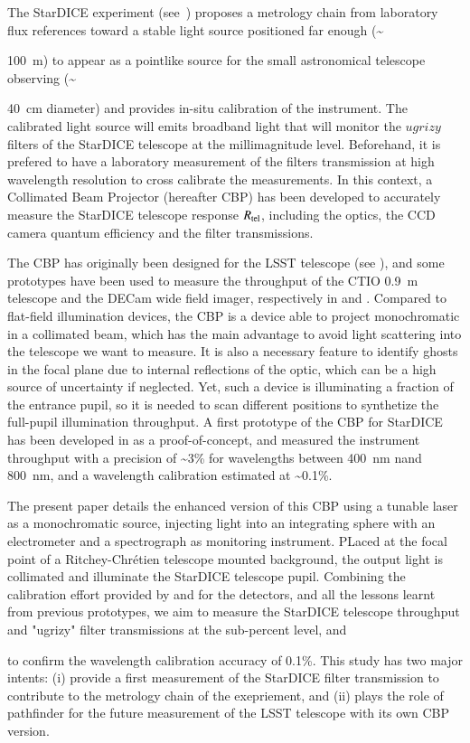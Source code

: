 The StarDICE experiment (see~\cite{Betoule_2023}) proposes a metrology chain from laboratory flux references toward a stable light source positioned far enough (\textasciitilde {\SI{100}{\meter}) to appear as a pointlike source for the small astronomical telescope observing (\textasciitilde {\SI{40}{\centi\meter} diameter) and provides in-situ calibration of the instrument. The calibrated light source will emits broadband light that will monitor the $ugrizy$ filters of the StarDICE telescope at the millimagnitude level. Beforehand, it is prefered to have a laboratory measurement of the filters transmission at high wavelength resolution to cross calibrate the measurements. In this context, a Collimated Beam Projector (hereafter CBP) has been developed to accurately measure the StarDICE telescope response $R_{\mathrm{tel}}$, including the optics, the CCD camera quantum efficiency and the filter transmissions. 

The CBP has originally been designed for the LSST telescope (see \cite{ingraham2016}), and some prototypes have been used to measure the throughput of the CTIO \SI{0.9}{\meter} telescope and the DECam wide field imager, respectively in \cite{coughlin2018} and \cite{coughlin2016}. Compared to flat-field illumination devices, the CBP is a device able to project monochromatic in a collimated beam, which has the main advantage to avoid light scattering into the telescope we want to measure. It is also a necessary feature to identify ghosts in the focal plane due to internal reflections of the optic, which can be a high source of uncertainty if neglected. Yet, such a device is illuminating a fraction of the entrance pupil, so it is needed to scan different positions to synthetize the full-pupil illumination throughput. A first prototype of the CBP for StarDICE has been developed in \cite{Mondrik_2023} as a proof-of-concept, and measured the instrument throughput with a precision of \textasciitilde 3\% for wavelengths between \SI{400}{\nano\meter} nand \SI{800}{\nano\meter}, and a wavelength calibration estimated at \textasciitilde 0.1\%. 

The present paper details the enhanced version of this CBP using a tunable laser as a monochromatic source, injecting light into an integrating sphere with an electrometer and a spectrograph as monitoring instrument. PLaced at the focal point of a Ritchey-Chrétien telescope mounted background, the output light is collimated and illuminate the StarDICE telescope pupil. Combining the calibration effort provided by \cite{houston2008detectors} and \cite{solarcell} for the detectors, and all the lessons learnt from previous prototypes, we aim to measure the StarDICE telescope throughput and "ugrizy" filter transmissions at the sub-percent level, and{ to confirm the wavelength calibration accuracy of 0.1\%. This study has two major intents: (i) provide a first measurement of the StarDICE filter transmission to contribute to the metrology chain of the exepriement, and (ii) plays the role of pathfinder for the future measurement of the LSST telescope with its own CBP version.

}}}
